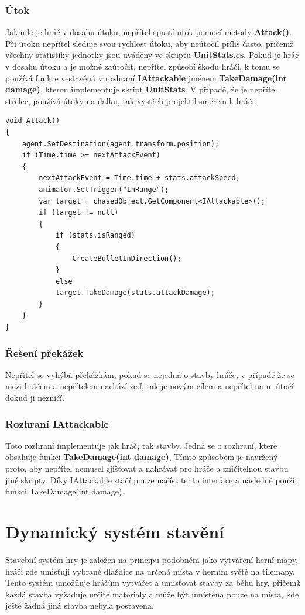 \subsubsection{Útok}
Jakmile je hráč v dosahu útoku, nepřítel spustí útok pomocí metody \textbf{Attack()}. Při útoku nepřítel sleduje svou rychlost útoku, aby neútočil příliš často, přičemž všechny statistiky jednotky jsou uváděny ve skriptu \textbf{UnitStats.cs}. Pokud je hráč v dosahu útoku a je možné zaútočit, nepřítel způsobí škodu hráči, k tomu se používá funkce vestavěná v rozhraní \textbf{IAttackable} jménem \textbf{TakeDamage(int damage)}, kterou implementuje skript \textbf{UnitStats}. V případě, že je nepřítel střelec, používá útoky na dálku, tak vystřelí projektil směrem k hráči.

\begin{lstlisting}
void Attack()
{
	agent.SetDestination(agent.transform.position);
	if (Time.time >= nextAttackEvent)
	{
		nextAttackEvent = Time.time + stats.attackSpeed;
		animator.SetTrigger("InRange");
		var target = chasedObject.GetComponent<IAttackable>();
		if (target != null)
		{
			if (stats.isRanged)
			{
				CreateBulletInDirection();
			}
			else
			target.TakeDamage(stats.attackDamage);
		}
	}
}
\end{lstlisting}

\subsubsection{Řešení překážek}
Nepřítel se vyhýbá překážkám, pokud se nejedná o stavby hráče, v případě že se mezi hráčem a nepřítelem nachází zeď, tak je novým cílem a nepřítel na ni útočí dokud ji nezničí.

\subsubsection{Rozhraní IAttackable}
Toto rozhraní implementuje jak hráč, tak stavby. Jedná se o rozhraní, které obsahuje funkci \textbf{TakeDamage(int damage)}, Tímto způsobem je navržený proto, aby nepřítel nemusel zjišťovat a nahrávat pro hráče a zničitelnou stavbu jiné skripty. Díky IAttackable stačí pouze načíst tento interface a následně použít funkci TakeDamage(int damage).

\section{Dynamický systém stavění}
\label{buildingSystem}
Stavební systém hry je založen na principu podobném jako vytváření herní mapy, hráči zde umisťují vybrané dlaždice na určená místa v herním světě na tilemapy. Tento systém umožňuje hráčům vytvářet a umisťovat stavby za běhu hry, přičemž každá stavba vyžaduje určité materiály a může být umístěna pouze na místa, kde ještě žádná jiná stavba nebyla postavena.

